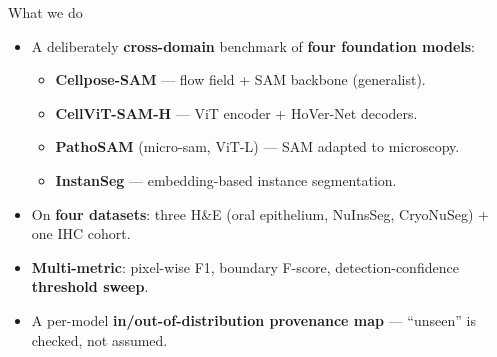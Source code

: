 \begin{frame}{What we do}
    \begin{itemize}
        \item A deliberately \textbf{cross-domain} benchmark of \textbf{four foundation models}:
        \begin{itemize}
            \item \textbf{Cellpose-SAM} --- flow field + SAM backbone (generalist).
            \item \textbf{CellViT-SAM-H} --- ViT encoder + HoVer-Net decoders.
            \item \textbf{PathoSAM} (micro-sam, ViT-L) --- SAM adapted to microscopy.
            \item \textbf{InstanSeg} --- embedding-based instance segmentation.
        \end{itemize}
        \item On \textbf{four datasets}: three H\&E (oral epithelium, NuInsSeg, CryoNuSeg) + one IHC cohort.
        \item \textbf{Multi-metric}: pixel-wise F1, boundary F-score, detection-confidence \textbf{threshold sweep}.
        \item A per-model \textbf{in/out-of-distribution provenance map} --- ``unseen'' is checked, not assumed.
    \end{itemize}
\end{frame}
